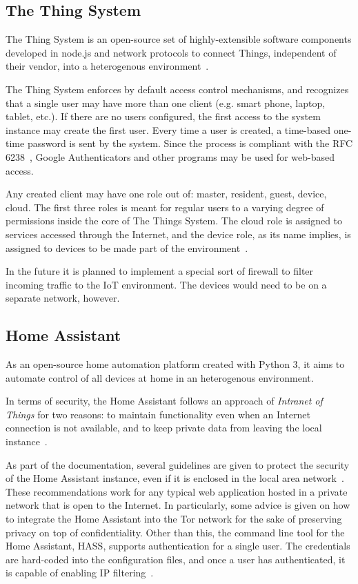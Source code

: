 \documentclass[12pt]{article}
\begin{document}
\subsection{The Thing System}

The Thing System is an open-source set of highly-extensible software components developed in node.js and network protocols to connect Things, independent of their vendor, into a heterogenous environment~\cite{related_08}.

The Thing System enforces by default access control mechanisms, and recognizes that a single user may have more than one client (e.g. smart phone, laptop, tablet, etc.). If there are no users configured, the first access to the system instance may create the first user. Every time a user is created, a time-based one-time password is sent by the system. Since the process is compliant with the RFC 6238~\cite{RFC6238}, Google Authenticators and other programs may be used for web-based access.

Any created client may have one role out of: master, resident, guest, device, cloud. The first three roles is meant for regular users to a varying degree of permissions inside the core of The Things System. The cloud role is assigned to services accessed through the Internet, and the device role, as its name implies, is assigned to devices to be made part of the environment~\cite{related_08}. 

In the future it is planned to implement a special sort of firewall to filter incoming traffic to the IoT environment. The devices would need to be on a separate network, however.

\subsection{Home Assistant}

As an open-source home automation platform created with Python 3, it aims to automate control of all devices at home in an heterogenous environment.

In terms of security, the Home Assistant follows an approach of \emph{Intranet of Things} for two reasons: to maintain functionality even when an Internet connection is not available, and to keep private data from leaving the local instance~\cite{related_11}.

As part of the documentation, several guidelines are given to protect the security of the Home Assistant instance, even if it is enclosed in the local area network~\cite{related_12}. These recommendations work for any typical web application hosted in a private network that is open to the Internet. In particularly, some advice is given on how to integrate the Home Assistant into the Tor network for the sake of preserving privacy on top of confidentiality. Other than this, the command line tool for the Home Assistant, HASS, supports authentication for a single user. The credentials are hard-coded into the configuration files, and once a user has authenticated, it is capable of enabling IP filtering~\cite{related_10}.
\end{document}

